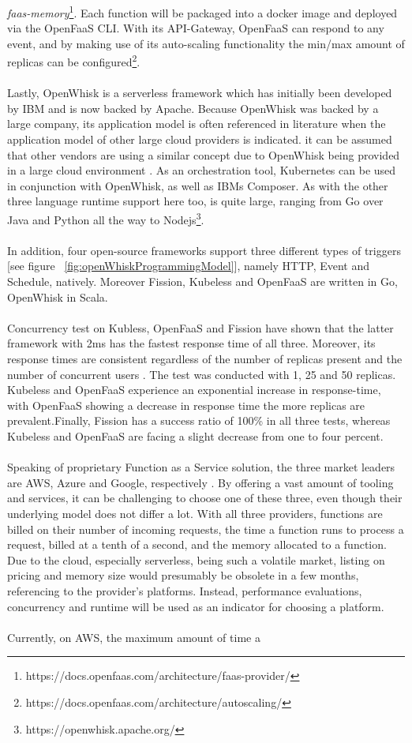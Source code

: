 \documentclass[11pt]{article}
\begin{document}
\textit{faas-memory}\footnote{https://docs.openfaas.com/architecture/faas-provider/}. Each function will be packaged into a docker image and deployed via the OpenFaaS CLI. With its API-Gateway, OpenFaaS can respond to any event, and by making use of its auto-scaling functionality the min/max amount of replicas can be configured\footnote{https://docs.openfaas.com/architecture/autoscaling/}.\\\\ Lastly, OpenWhisk is a serverless framework which has initially been developed by IBM and is now backed by Apache. Because OpenWhisk was backed by a large company, its application model is often referenced in literature when the application model of other large cloud providers is indicated. it can be assumed that other vendors are using a similar concept due to OpenWhisk being provided in a large cloud environment \cite{van2019spec}. As an orchestration tool, Kubernetes can be used in conjunction with OpenWhisk, as well as IBMs Composer. As with the other three language runtime support here too, is quite large, ranging from Go over Java and Python all the way to Nodejs\footnote{https://openwhisk.apache.org/}.\\\\ In addition, four open-source frameworks support three different types of triggers [see figure ~\ref{fig:openWhiskProgrammingModel}], namely HTTP, Event and Schedule, natively. Moreover Fission, Kubeless and OpenFaaS are written in Go, OpenWhisk in Scala.\\\\ Concurrency test on Kubless, OpenFaaS and Fission have shown that the latter framework with 2ms has the fastest response time of all three. Moreover, its response times are consistent regardless of the number of replicas present and the number of concurrent users \cite{mohanty2018evaluation}. The test was conducted with 1, 25 and 50 replicas. Kubeless and OpenFaaS experience an exponential increase in response-time, with OpenFaaS showing a decrease in response time the more replicas are prevalent.Finally, Fission has a success ratio of 100\% in all three tests, whereas Kubeless and OpenFaaS are facing a slight decrease from one to four percent.\\\\ Speaking of proprietary Function as a Service solution, the three market leaders are AWS, Azure and Google, respectively \cite{kumar2019serverless}. By offering a vast amount of tooling and services, it can be challenging to choose one of these three, even though their underlying model does not differ a lot. With all three providers, functions are billed on their number of incoming requests, the time a function runs to process a request, billed at a tenth of a second, and the memory allocated to a function. Due to the cloud, especially serverless, being such a volatile market, listing on pricing and memory size would presumably be obsolete in a few months, referencing to the provider's platforms. Instead, performance evaluations, concurrency and runtime will be used as an indicator for choosing a platform.\\\\ Currently, on AWS, the maximum amount of time a 
\end{document}
